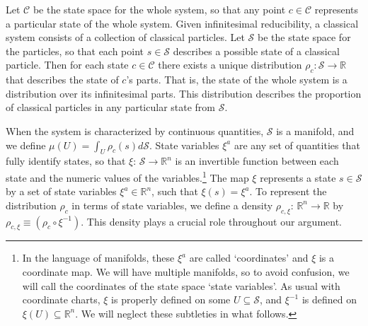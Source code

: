 \documentclass[12pt, english, twoside]{article} %
\begin{document}
Let $\mathcal{C}$ be the state space for the whole system, so that any point $c \in \mathcal{C}$ represents a particular state of the whole system. Given infinitesimal reducibility, a classical system consists of a collection of classical particles. Let $\mathcal{S}$ be the state space for the particles, so that each point $s \in \mathcal{S}$ describes a possible state of a classical particle. Then for each state $c \in \mathcal{C}$ there exists a unique distribution $\rho_c : \mathcal{S} \to \mathbb{R} $ that describes the state of $c$'s parts. That is, the state of the whole system is a distribution over its infinitesimal parts. This distribution describes the proportion of classical particles in any particular state from $\mathcal{S}$.



When the system is characterized by continuous quantities, $\mathcal{S}$ is a manifold, and we define $\mu(U) = \int_U \rho_c(s) d\mathcal{S} $. State variables $\xi^a$ are any set of quantities that fully identify states, so that $\xi$: $\mathcal{S} \to \mathbb{R}^n$ is an invertible function between each state and the numeric values of the variables.\footnote{In the language of manifolds, these $\xi^a$ are called `coordinates' and $\xi$ is a coordinate map. We will have multiple manifolds, so to avoid confusion, we will call the coordinates of the state space `state variables'. As usual with coordinate charts, $\xi$ is properly defined on some $U \subseteq \mathcal{S}$, and $\xi^{-1}$ is defined on $\xi(U) \subseteq \mathbb{R}^n$. We will neglect these subtleties in what follows.} The map $\xi$ represents a state $s \in \mathcal{S}$ by a set of state variables $\xi^a \in \mathbb{R}^n$, such that $\xi (s) = \xi^a$. To represent the distribution $\rho_c$ in terms of state variables, we define a density $\rho_{c, \xi}$: $\mathbb{R}^n \to \mathbb{R}$ by $\rho_{c, \xi} \equiv (\rho_c \circ \xi^{-1})$. This density plays a crucial role throughout our argument. 
\end{document}
